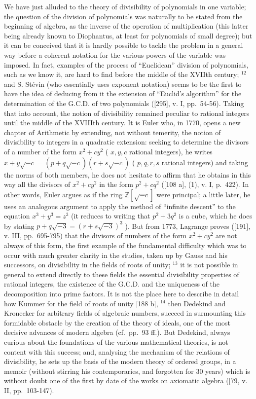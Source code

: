 We have just alluded to the theory of divisibility of polynomials in one variable; the question of the division of polynomials was naturally to be stated from the beginning of algebra, as the inverse of the operation of multiplication (this latter being already known to Diophantus, at least for polynomials of small degree); but it can be conceived that it is hardly possible to tackle the problem in a general way before a coherent notation for the various powers of the variable was imposed. In fact, examples of the process of ``Euclidean'' division of polynomials, such as we know it, are hard to find before the middle of the XVIIth century; \(^{12}\) and S. Stévin (who essentially uses exponent notation) seems to be the first to have the idea of deducing from it the extension of ``Euclid's algorithm'' for the determination of the G.C.D. of two polynomials ({[}295{]}, v. I, pp.~54-56). Taking that into account, the notion of divisibility remained peculiar to rational integers until the middle of the XVIIIth century. It is Euler who, in 1770, opens a new chapter of Arithmetic by extending, not without temerity, the notion of divisibility to integers in a quadratic extension: seeking to determine the divisors of a number of the form \(x^{2}+cy^{2}\) ( \(x,y,c\) rational integers), he writes \(x+y\sqrt{-c}=(p+q\sqrt{-c})(r+s\sqrt{-c})\) ( \(p,q,r,s\) rational integers) and taking the norms of both members, he does not hesitate to affirm that he obtains in this way all the divisors of \(x^{2}+cy^{2}\) in the form \(p^{2}+cq^{2}\) ({[}108 a{]}, (1), v. I, p.~422). In other words, Euler argues as if the ring \(\mathbb{Z}[\sqrt{-c}]\) were principal; a little later, he uses an analogous argument to apply the method of ``infinite descent'' to the equation \(x^{3}+y^{3}=z^{3}\) (it reduces to writing that \(p^{2}+3q^{2}\) is a cube, which he does by stating \(p+q\sqrt{-3}=(r+s\sqrt{-3})^{3}\) ). But from 1773, Lagrange proves ({[}191{]}, v. III, pp.~695-795) that the divisors of numbers of the form \(x^{2}+cy^{2}\) are not always of this form, the first example of the fundamental difficulty which was to occur with much greater clarity in the studies, taken up by Gauss and his successors, on divisibility in the fields of roots of unity; \(^{13}\) it is not possible in general to extend directly to these fields the essential divisibility properties of rational integers, the existence of the G.C.D. and the uniqueness of the decomposition into prime factors. It is not the place here to describe in detail how Kummer for the field of roots of unity {[}188 b{]}, \(^{14}\) then Dedekind and Kronecker for arbitrary fields of algebraic numbers, succeed in surmounting this formidable obstacle by the creation of the theory of ideals, one of the most decisive advances of modern algebra (cf.~pp.~93 ff.). But Dedekind, always curious about the foundations of the various mathematical theories, is not content with this success; and, analysing the mechanism of the relations of divisibility, he sets up the basis of the modern theory of ordered groups, in a memoir (without stirring his contemporaries, and forgotten for 30 years) which is without doubt one of the first by date of the works on axiomatic algebra ({[}79, v. II, pp.~103-147).

